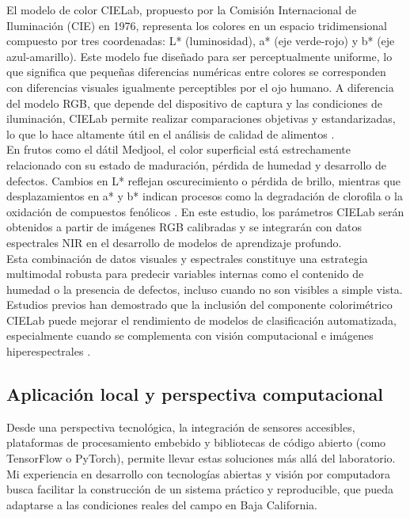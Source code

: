 El modelo de color CIELab, propuesto por la Comisión Internacional de Iluminación (CIE) en 1976, representa los colores en un espacio tridimensional compuesto por tres coordenadas: L* (luminosidad), a* (eje verde-rojo) y b* (eje azul-amarillo). Este modelo fue diseñado para ser perceptualmente uniforme, lo que significa que pequeñas diferencias numéricas entre colores se corresponden con diferencias visuales igualmente perceptibles por el ojo humano. A diferencia del modelo RGB, que depende del dispositivo de captura y las condiciones de iluminación, CIELab permite realizar comparaciones objetivas y estandarizadas, lo que lo hace altamente útil en el análisis de calidad de alimentos \parencite{cen_theory_2007}.\\

En frutos como el dátil Medjool, el color superficial está estrechamente relacionado con su estado de maduración, pérdida de humedad y desarrollo de defectos. Cambios en L* reflejan oscurecimiento o pérdida de brillo, mientras que desplazamientos en a* y b* indican procesos como la degradación de clorofila o la oxidación de compuestos fenólicos \parencite{knott_facilitated_2023}. En este estudio, los parámetros CIELab serán obtenidos a partir de imágenes RGB calibradas y se integrarán con datos espectrales NIR en el desarrollo de modelos de aprendizaje profundo.\\

Esta combinación de datos visuales y espectrales constituye una estrategia multimodal robusta para predecir variables internas como el contenido de humedad o la presencia de defectos, incluso cuando no son visibles a simple vista. Estudios previos han demostrado que la inclusión del componente colorimétrico CIELab puede mejorar el rendimiento de modelos de clasificación automatizada, especialmente cuando se complementa con visión computacional e imágenes hiperespectrales \parencite{habib_external_2022}.

\subsection{Aplicación local y perspectiva computacional}

Desde una perspectiva tecnológica, la integración de sensores accesibles, plataformas de procesamiento embebido y bibliotecas de código abierto (como TensorFlow o PyTorch), permite llevar estas soluciones más allá del laboratorio. Mi experiencia en desarrollo con tecnologías abiertas y visión por computadora busca facilitar la construcción de un sistema práctico y reproducible, que pueda adaptarse a las condiciones reales del campo en Baja California.\\

